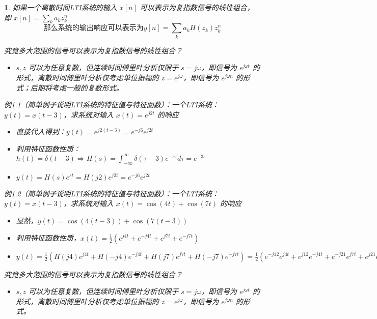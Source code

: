 \documentclass[UTF8]{report}
\theoremstyle{MyLineTheoremStyle} %
\theoremstyle{MyBlockTheoremStyle} %
\theoremstyle{MySubsubsectionStyle} %
\newtheorem{definition}{}
\begin{document}
\begin{definition}
    如果一个离散时间LTI系统的输入 $x[n]$ 可以表示为复指数信号的线性组合，即 $x[n] = \sum_{k} a_k z_k^n$
    \[
    \text{那么系统的输出响应可以表示为} y[n] = \sum_{k} a_k H(z_k) z_k^n
    \]

    究竟多大范围的信号可以表示为复指数信号的线性组合？
    \begin{itemize}
        \item $s, z$ 可以为任意复数，但连续时间傅里叶分析仅限于 $s = j\omega$，即信号为 $e^{j\omega t}$ 的形式，离散时间傅里叶分析仅考虑单位振幅的 $z = e^{j\omega}$，即信号为 $e^{j\omega n}$ 的形式；后期将考虑一般的复数形式。
    \end{itemize}

    例1.1（简单例子说明LTI系统的特征值与特征函数）：一个LTI系统：$y(t) = x(t - 3)$，求系统对输入 $x(t) = e^{j2t}$ 的响应
    \begin{itemize}
        \item 直接代入得到：$y(t) = e^{j2(t-3)} = e^{-j6} e^{j2t}$
        \item 利用特征函数性质：$h(t) = \delta(t - 3) \Rightarrow H(s) = \int_{-\infty}^{\infty} \delta(\tau - 3) e^{-s\tau} d\tau = e^{-3s}$
        \item $y(t) = H\left(s\right)e^{st} = H(j2)e^{j2t} = e^{-j6} e^{j2t}$
    \end{itemize}

    例1.2（简单例子说明LTI系统的特征值与特征函数）：一个LTI系统：$y(t) = x(t - 3)$，求系统对输入 $x(t) = \cos(4t) + \cos(7t)$ 的响应
    \begin{itemize}
        \item 显然，$y(t) = \cos(4(t - 3)) + \cos(7(t - 3))$
        \item 利用特征函数性质，$x(t) = \frac{1}{2} (e^{j4t} + e^{-j4t} + e^{j7t} + e^{-j7t})$
        \item $y(t) = \frac{1}{2} (H(j4)e^{j4t} + H(-j4)e^{-j4t} + H(j7)e^{j7t} + H(-j7)e^{-j7t}) = \frac{1}{2} (e^{-j12}e^{j4t} + e^{j12}e^{-j4t} + e^{-j21}e^{j7t} + e^{j21}e^{-j7t}) = \cos\left(4\left(t-3\right)\right) + \cos\left(7\left(t-3\right)\right)$
    \end{itemize}

    究竟多大范围的信号可以表示为复指数信号的线性组合？
    \begin{itemize}
        \item $s, z$ 可以为任意复数，但连续时间傅里叶分析仅限于 $s = j\omega$，即信号为 $e^{j\omega t}$ 的形式，离散时间傅里叶分析仅考虑单位振幅的 $z = e^{j\omega}$，即信号为 $e^{j\omega n}$ 的形式。
    \end{itemize}
\end{definition}
\end{document}
